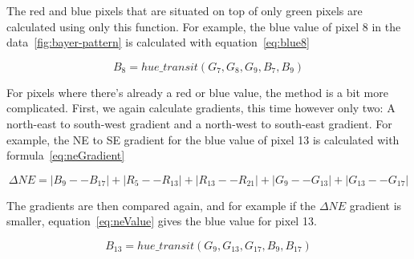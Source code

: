 The red and blue pixels that are situated on top of only green pixels are
calculated using only this function. For example, the blue value of pixel 8 in
the data~\ref{fig:bayer-pattern} is calculated with equation~\ref{eq:blue8}

\begin{equation}
  \label{eq:blue8}
  B_8 = hue\_transit(G_7, G_8, G_9, B_7, B_9)
\end{equation}


For pixels where there's already a red or blue value, the method is a bit more
complicated. First, we again calculate gradients, this time however only two: A
north-east to south-west gradient and a north-west to south-east gradient. For
example, the NE to SE gradient for the blue value of pixel 13 is calculated
with formula~\ref{eq:neGradient}

\begin{equation}
  \label{eq:neGradient}
  \Delta NE = | B_9 −- B_{17} | + | R_5 −- R_{13} | + | R_{13} -− R_{21} | + | G_9
  −- G_{13} | + | G_{13} -− G_{17} |
\end{equation}

The gradients are then compared again, and for example if the \(\Delta NE\)
gradient is smaller, equation~\ref{eq:neValue} gives the blue value for pixel
13.

\begin{equation}
  \label{eq:neValue}
  B_{13} = hue\_transit(G_9, G_{13}, G_{17}, B_9, B_{17})
\end{equation}




















